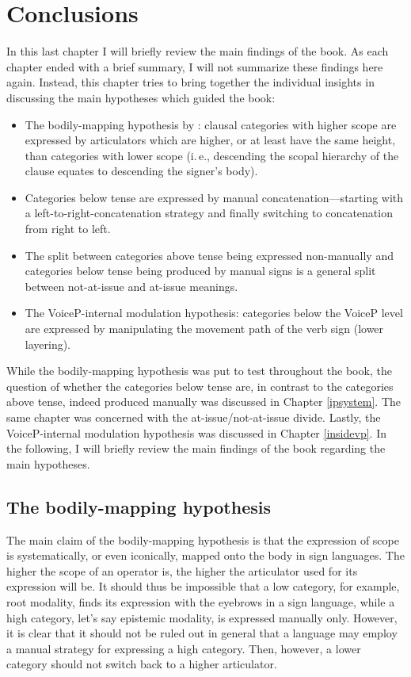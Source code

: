 \chapter{Conclusions}\label{chapterconclusions}
In this last chapter I will briefly review the main findings of the book. As each chapter ended with a brief summary, I will not summarize these findings here again. Instead, this chapter tries to bring together the individual insights in discussing the main hypotheses which guided the book:


\begin{itemize}[itemsep=0pt]
	\item The bodily-mapping hypothesis by \citet{bross2017scope}: clausal categories with higher scope are expressed by articulators which are higher, or at least have the same height, than categories with lower scope (i.\,e., descending the scopal hierarchy of the clause equates to descending the signer's body).
	\item Categories below tense are expressed by manual concatenation---starting with a left-to-right-concatenation strategy and finally switching to concatenation from right to left.
	\item The split between categories above tense being expressed non-manually and categories below tense being produced by manual signs is a general split between not-at-issue and at-issue meanings.
	\item The VoiceP-internal modulation hypothesis: categories below the VoiceP level are expressed by manipulating the movement path of the verb sign (lower layering).
\end{itemize}

\noindent While the bodily-mapping hypothesis was put to test throughout the book, the question of whether the categories below tense are, in contrast to the categories above tense, indeed produced manually was discussed in Chapter \ref{ipsystem}. The same chapter was concerned with the at-issue/not-at-issue divide. Lastly, the VoiceP-internal modulation hypothesis was discussed in Chapter \ref{insidevp}. In the following, I will briefly review the main findings of the book regarding the main hypotheses.

\section{The bodily-mapping hypothesis}
The main claim of the bodily-mapping hypothesis is that the expression of scope is systematically, or even iconically, mapped onto the body in sign languages. The higher the scope of an operator is, the higher the articulator used for its expression will be. It should thus be impossible that a low category, for example, root modality, finds its expression with the eyebrows in a sign language, while a high category, let's say epistemic modality, is expressed manually only. However, it is clear that it should not be ruled out in general that a language may employ a manual strategy for expressing a high category. Then, however, a lower category should not switch back to a higher articulator. 

